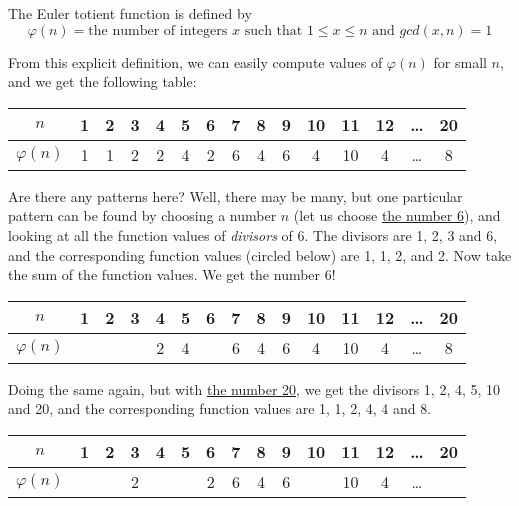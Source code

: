 \documentclass[a4paper]{article}
\begin{document}
\begin{example}
The Euler totient function is defined by
$$  \varphi(n) = \textrm{the number of integers $x$ such that $1 \leq x \leq n$ and $gcd(x, n) = 1$}  $$

From this explicit definition, we can easily compute values of $\varphi(n)$ for small $n$, and we get the following table:

\vspace{6pt}
\begin{tabular}{  | c || c | c | c | c | c | c | c | c | c | c | c | c | c | c |  }
  \hline			
  $n$ & 1 & 2 & 3 & 4 & 5 & 6 & 7 & 8 & 9 & 10 & 11 & 12 & \ldots & 20  \\
  \hline
  $\varphi(n) $ & 1 & 1 & 2 & 2 & 4 & 2 & 6 & 4 & 6 & 4 & 10 & 4 & \ldots & 8  \\
  \hline  
\end{tabular}
\vspace{6pt}

Are there any patterns here? Well, there may be many, but one particular pattern can be found by choosing a number $n$ (let us choose \underline{the number 6}), and looking at all the function values of \emph{divisors} of 6. The divisors are 1, 2, 3 and 6, and the corresponding function values (circled below) are 1, 1, 2, and 2. Now take the sum of the function values. We get the number 6!

\vspace{6pt}
\begin{tabular}{  | c || c | c | c | c | c | c | c | c | c | c | c | c | c | c |  }
  \hline			
  $n$ & \bf{1} & \bf{2} & \bf{3} & 4 & 5 & \bf{6} & 7 & 8 & 9 & 10 & 11 & 12 & \ldots & 20  \\
  \hline
  $\varphi(n) $ & \raisebox{.5pt}{\textcircled{\raisebox{-.9pt} {1}}} & \raisebox{.5pt}{\textcircled{\raisebox{-.9pt} {1}}} & \raisebox{.5pt}{\textcircled{\raisebox{-.9pt} {2}}} & 2 & 4 & \raisebox{.5pt}{\textcircled{\raisebox{-.9pt} {2}}} & 6 & 4 & 6 & 4 & 10 & 4 & \ldots & 8  \\
  \hline  
\end{tabular}
\vspace{6pt}

Doing the same again, but with \underline{the number 20}, we get the divisors 1, 2, 4, 5, 10 and 20, and the corresponding function values are 1, 1, 2, 4, 4 and 8. 

\vspace{6pt}
\begin{tabular}{  | c || c | c | c | c | c | c | c | c | c | c | c | c | c | c |  }
  \hline			
  $n$ & \bf{1} & \bf{2} & 3 & \bf{4} & \bf{5} & 6 & 7 & 8 & 9 & \bf{10} & 11 & 12 & \ldots & \bf{20}  \\
  \hline
  $\varphi(n) $ & \raisebox{.5pt}{\textcircled{\raisebox{-.9pt} {1}}} & \raisebox{.5pt}{\textcircled{\raisebox{-.9pt} {1}}} & 2 &  \raisebox{.5pt}{\textcircled{\raisebox{-.9pt} {2}}} &  \raisebox{.5pt}{\textcircled{\raisebox{-.9pt} {4}}} & 2 & 6 & 4 & 6 &  \raisebox{.5pt}{\textcircled{\raisebox{-.9pt} {4}}} & 10 & 4 & \ldots &  \raisebox{.5pt}{\textcircled{\raisebox{-.9pt} {8}}}  \\
  \hline  
\end{tabular}
\vspace{6pt}


\end{example}
\end{document}
